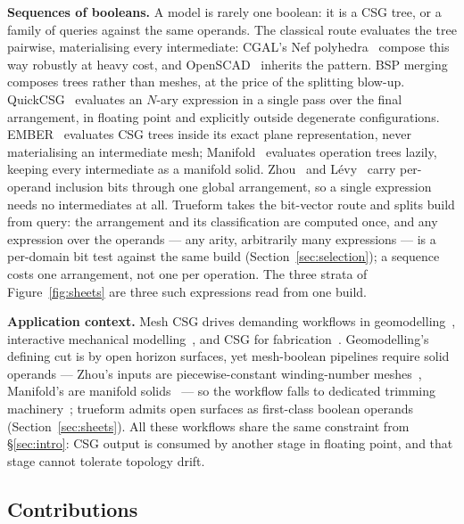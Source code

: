 \documentclass{egpubl}
\begin{document}
\textbf{Sequences of booleans.} A model is rarely one boolean: it is a CSG tree, or a family of queries against the same operands. The classical route evaluates the tree pairwise, materialising every intermediate: CGAL's Nef polyhedra~\cite{Nef1978,Hachenberger2007} compose this way robustly at heavy cost, and OpenSCAD~\cite{OpenSCAD} inherits the pattern. BSP merging~\cite{NaylorAmanatidesThibault1990} composes trees rather than meshes, at the price of the splitting blow-up. QuickCSG~\cite{Douze2017QuickCSG} evaluates an $N$-ary expression in a single pass over the final arrangement, in floating point and explicitly outside degenerate configurations. EMBER~\cite{Trettner2022} evaluates CSG trees inside its exact plane representation, never materialising an intermediate mesh; Manifold~\cite{Manifold} evaluates operation trees lazily, keeping every intermediate as a manifold solid. Zhou~\cite{Zhou2016} and L\'evy~\cite{Levy2025} carry per-operand inclusion bits through one global arrangement, so a single expression needs no intermediates at all. Trueform takes the bit-vector route and splits build from query: the arrangement and its classification are computed once, and any expression over the operands --- any arity, arbitrarily many expressions --- is a per-domain bit test against the same build (Section~\ref{sec:selection}); a sequence costs one arrangement, not one per operation. The three strata of Figure~\ref{fig:sheets} are three such expressions read from one build.

\textbf{Application context.} Mesh CSG drives demanding workflows in geomodelling~\cite{Caumon2003,Pellerin2017}, interactive mechanical modelling~\cite{Tymms2016}, and CSG for fabrication~\cite{Garg2016}. Geomodelling's defining cut is by open horizon surfaces, yet mesh-boolean pipelines require solid operands --- Zhou's inputs are piecewise-constant winding-number meshes~\cite{Zhou2016}, Manifold's are manifold solids~\cite{Manifold} --- so the workflow falls to dedicated trimming machinery~\cite{Pellerin2017}; trueform admits open surfaces as first-class boolean operands (Section~\ref{sec:sheets}). All these workflows share the same constraint from \S\ref{sec:intro}: CSG output is consumed by another stage in floating point, and that stage cannot tolerate topology drift.

\subsection{Contributions}
\label{sec:contributions}
\end{document}
